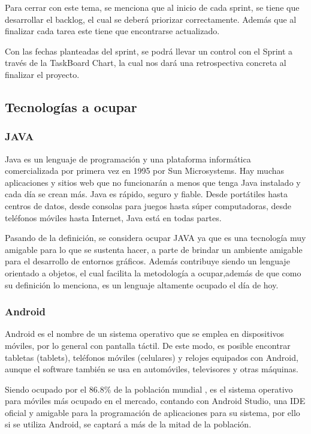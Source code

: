\documentclass[10pt]{article}
\begin{document}
Para cerrar con este tema, se menciona que al inicio de cada sprint, se tiene que desarrollar el backlog, el cual se deberá priorizar correctamente. Además que al finalizar cada tarea este tiene que encontrarse actualizado.

Con las fechas planteadas del sprint, se podrá llevar un control con el Sprint a través de la TaskBoard Chart, la cual nos dará una retrospectiva concreta al finalizar el proyecto.

\newpage

\subsection{Tecnologías a ocupar}
\subsubsection{JAVA}
Java es un lenguaje de programación y una plataforma informática comercializada por primera vez en 1995 por Sun Microsystems. Hay muchas aplicaciones y sitios web que no funcionarán a menos que tenga Java instalado y cada día se crean más. Java es rápido, seguro y fiable. Desde portátiles hasta centros de datos, desde consolas para juegos hasta súper computadoras, desde teléfonos móviles hasta Internet, Java está en todas partes\cite{IEEEreferencias:Ref40}.

Pasando de la definición, se considera ocupar JAVA ya que es una tecnología muy amigable para lo que se sustenta hacer, a parte de brindar un ambiente amigable para el desarrollo de entornos gráficos. Además contribuye siendo un lenguaje orientado a objetos, el cual facilita la metodología a ocupar,además de que como su definición lo menciona, es un lenguaje altamente ocupado el día de hoy.

\subsubsection{Android}
Android es el nombre de un sistema operativo que se emplea en dispositivos móviles, por lo general con pantalla táctil. De este modo, es posible encontrar tabletas (tablets), teléfonos móviles (celulares) y relojes equipados con Android, aunque el software también se usa en automóviles, televisores y otras máquinas\cite{IEEEreferencias:Ref41}.

Siendo ocupado por el 86.8\% de la población mundial \cite{IEEEreferencias:Ref42}, es el sistema operativo para móviles más ocupado en el mercado, contando con Android Studio, una IDE oficial y amigable para la programación de aplicaciones para su sistema, por ello si se utiliza Android, se captará a más de la mitad de la población.
\end{document}
